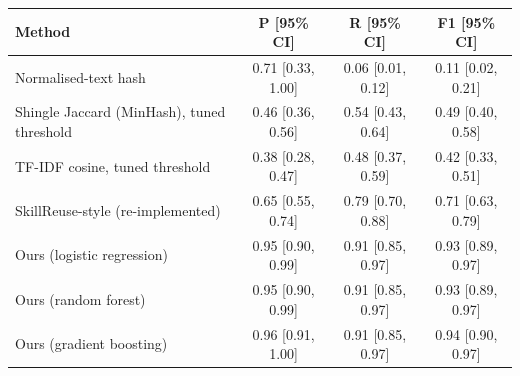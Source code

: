 \begin{tabular}{lccc}
\toprule
Method & P [95\% CI] & R [95\% CI] & F1 [95\% CI] \\
\midrule
Normalised-text hash & 0.71 [0.33, 1.00] & 0.06 [0.01, 0.12] & 0.11 [0.02, 0.21] \\
Shingle Jaccard (MinHash), tuned threshold & 0.46 [0.36, 0.56] & 0.54 [0.43, 0.64] & 0.49 [0.40, 0.58] \\
TF-IDF cosine, tuned threshold & 0.38 [0.28, 0.47] & 0.48 [0.37, 0.59] & 0.42 [0.33, 0.51] \\
SkillReuse-style (re-implemented) & 0.65 [0.55, 0.74] & 0.79 [0.70, 0.88] & 0.71 [0.63, 0.79] \\
\midrule
Ours (logistic regression) & 0.95 [0.90, 0.99] & 0.91 [0.85, 0.97] & 0.93 [0.89, 0.97] \\
Ours (random forest) & 0.95 [0.90, 0.99] & 0.91 [0.85, 0.97] & 0.93 [0.89, 0.97] \\
Ours (gradient boosting) & 0.96 [0.91, 1.00] & 0.91 [0.85, 0.97] & 0.94 [0.90, 0.97] \\
\bottomrule
\end{tabular}
